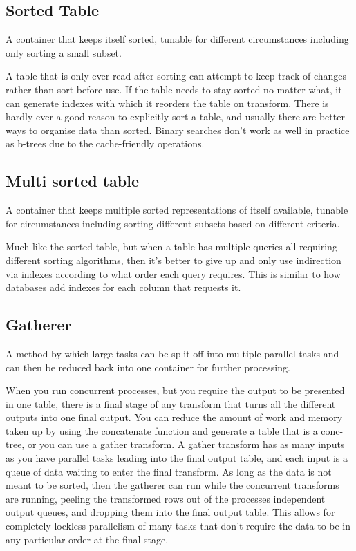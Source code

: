 \subsection{Sorted Table}

A container that keeps itself sorted, tunable for different circumstances
including only sorting a small subset.

A table that is only ever read after sorting can attempt to keep track of
changes rather than sort before use. If the table needs to stay sorted no
matter what, it can generate indexes with which it reorders the table on
transform. There is hardly ever a good reason to explicitly sort a table, and
usually there are better ways to organise data than sorted. Binary searches
don't work as well in practice as b-trees due to the cache-friendly operations.

\subsection{Multi sorted table}

A container that keeps multiple sorted representations of itself available,
tunable for circumstances including sorting different subsets based on
different criteria.

Much like the sorted table, but when a table has multiple queries all requiring
different sorting algorithms, then it's better to give up and only use
indirection via indexes according to what order each query requires. This is
similar to how databases add indexes for each column that requests it.

\subsection{Gatherer}

A method by which large tasks can be split off into multiple parallel tasks and
can then be reduced back into one container for further processing.

When you run concurrent processes, but you require the output to be presented
in one table, there is a final stage of any transform that turns all the
different outputs into one final output. You can reduce the amount of work and
memory taken up by using the concatenate function and generate a table that is
a conc-tree, or you can use a gather transform. A gather transform has as many
inputs as you have parallel tasks leading into the final output table, and
each input is a queue of data waiting to enter the final transform. As long as
the data is not meant to be sorted, then the gatherer can run while the
concurrent transforms are running, peeling the transformed rows out of the
processes independent output queues, and dropping them into the final output
table. This allows for completely lockless parallelism of many tasks that don't
require the data to be in any particular order at the final stage.

